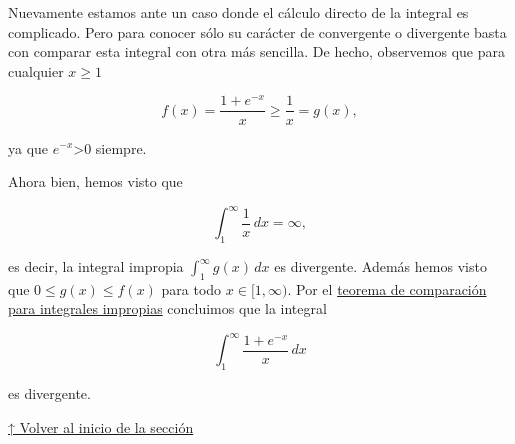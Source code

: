 \documentclass[
  letterpaper,
]{book}
\theoremstyle{plain}
\theoremstyle{remark}
\begin{document}
\begin{tcolorbox}[enhanced jigsaw, opacityback=0, left=2mm, opacitybacktitle=0.6, toprule=.15mm, bottomrule=.15mm, colbacktitle=quarto-callout-tip-color!10!white, titlerule=0mm, bottomtitle=1mm, title=\textcolor{quarto-callout-tip-color}{\faLightbulb}\hspace{0.5em}{Solución}, toptitle=1mm, colframe=quarto-callout-tip-color-frame, colback=white, breakable, rightrule=.15mm, arc=.35mm, leftrule=.75mm, coltitle=black]

Nuevamente estamos ante un caso donde el cálculo directo de la integral
es complicado. Pero para conocer sólo su carácter de convergente o
divergente basta con comparar esta integral con otra más sencilla. De
hecho, observemos que para cualquier \(x\geq 1\)

\[
f(x)=\frac{1+e^{-x}}{x}\geq \frac{1}{x}=g(x),
\]

ya que \(e^{-x}\)\textgreater0 siempre.

Ahora bien, hemos visto que

\[
\int_1^\infty \frac{1}{x}\,dx=\infty,
\]

es decir, la integral impropia \(\displaystyle \int_1^\infty g(x)\,dx\)
es divergente. Además hemos visto que \(0\leq g(x)\leq f(x)\) para todo
\(x\in[1,\infty)\). Por el \hyperref[teo-comparacion]{teorema de
comparación para integrales impropias} concluimos que la integral

\[
\int_{1}^{\infty}\frac{1+e^{-x}}{x}\,dx
\]

es divergente.

\end{tcolorbox}

\hyperref[seccion_7.8]{↑ Volver al inicio de la sección}


\backmatter
\end{document}
